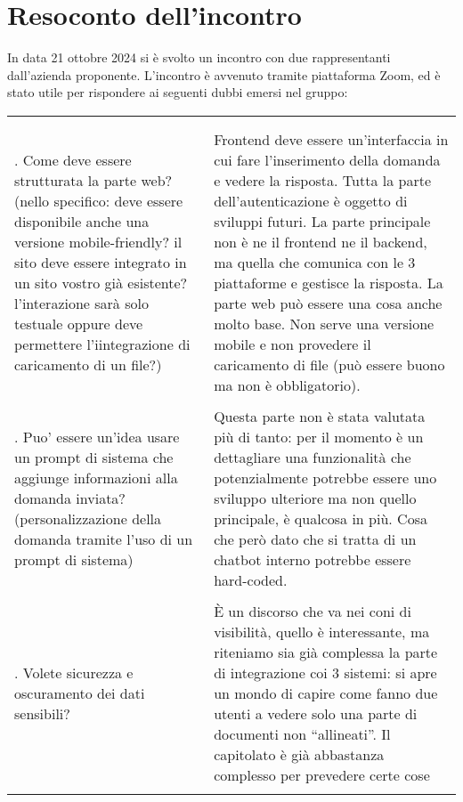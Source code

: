 \section{Resoconto dell'incontro}

In data 21 ottobre 2024 si è svolto un incontro con due rappresentanti dall'azienda proponente.
L'incontro è avvenuto tramite piattaforma Zoom, ed è stato utile per rispondere ai seguenti dubbi emersi nel gruppo:

\begingroup
\renewcommand{\ni}{\noindent}

  \vspace{0.5cm}

  \begin{tabular}{>{\justifying\arraybackslash}p{} >{\justifying\arraybackslash}p{}}
      \multicolumn{1}{c}{\textbf{Domande}} & \multicolumn{1}{c}{\textbf{Risposte}} \\ \\
      
      \ni 1. Come deve essere strutturata la parte web? (nello specifico: deve essere disponibile anche una versione mobile-friendly? il sito deve essere 
      integrato in un sito vostro già esistente?l'interazione sarà solo testuale oppure deve permettere l'iintegrazione di caricamento di un file?)
      & \ni Frontend deve essere un’interfaccia in cui fare l’inserimento della domanda e vedere la risposta.
      Tutta la parte dell’autenticazione è oggetto di sviluppi futuri.
      La parte principale non è ne il frontend ne il backend, ma quella che comunica con le 3 piattaforme e gestisce la risposta. La parte web può essere 
      una cosa anche molto base.
      Non serve una versione mobile e non provedere il caricamento di file (può essere buono ma non è obbligatorio). \\ \\
      
      \ni 2. Puo’ essere un’idea usare un prompt di sistema che aggiunge informazioni alla domanda inviata? (personalizzazione della domanda tramite l'uso 
      di un prompt di sistema)
      & \ni Questa parte non è stata valutata più di tanto: per il momento è un dettagliare una funzionalità che potenzialmente potrebbe essere uno
      sviluppo ulteriore ma non quello principale, è qualcosa in più. Cosa che però dato che si tratta di un chatbot interno potrebbe essere hard-coded. \\ \\
      
      \ni 3. Volete sicurezza e oscuramento dei dati sensibili?
      & \ni È un discorso che va nei coni di visibilità, quello è interessante, ma riteniamo sia già complessa la parte di integrazione coi 3 sistemi:
      si apre un mondo di capire come fanno due utenti a vedere solo una parte di documenti non “allineati”.
      Il capitolato è già abbastanza complesso per prevedere certe cose \\ \\


\end{tabular}
